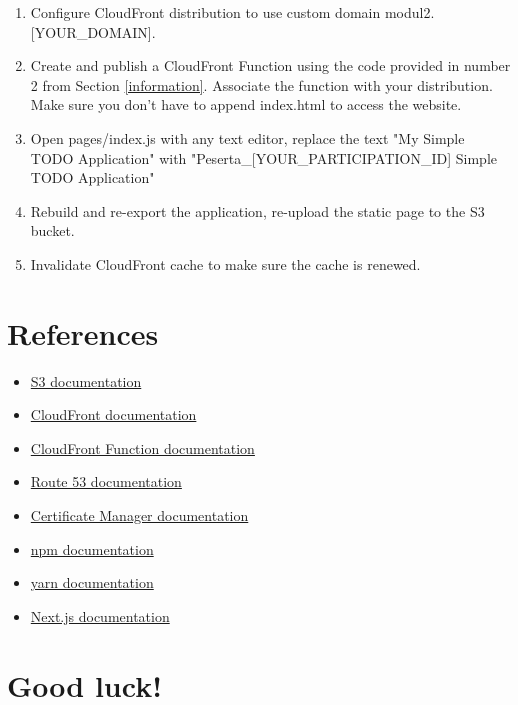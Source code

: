 \documentclass{article}
\begin{document}
\begin{enumerate}
    \item Configure CloudFront distribution to use custom domain modul2.[YOUR\_DOMAIN].
    \item Create and publish a CloudFront Function using the code provided in number 2 from Section \ref{information}. Associate the function with your distribution.\\
    Make sure you don't have to append index.html to access the website.
    \item Open pages/index.js with any text editor, replace the text "My Simple TODO Application" with "Peserta\_[YOUR\_PARTICIPATION\_ID] Simple TODO Application"
    \item Rebuild and re-export the application, re-upload the static page to the S3 bucket.
    \item Invalidate CloudFront cache to make sure the cache is renewed.
\end{enumerate}

\section{References}\label{references}

\begin{itemize}
    \item \href{https://docs.aws.amazon.com/AmazonS3/latest/userguide/Welcome.html}{S3 documentation}
    \item \href{https://docs.aws.amazon.com/AmazonCloudFront/latest/DeveloperGuide/Introduction.html}{CloudFront documentation}
    \item \href{https://docs.aws.amazon.com/AmazonCloudFront/latest/DeveloperGuide/cloudfront-functions.html}{CloudFront Function documentation}
    \item \href{https://docs.aws.amazon.com/Route53/latest/DeveloperGuide/Welcome.html}{Route 53 documentation}
    \item \href{https://docs.aws.amazon.com/acm/latest/userguide/acm-overview.html}{Certificate Manager documentation}
    \item \href{https://docs.npmjs.com/cli/v8/commands}{npm documentation}
    \item \href{https://classic.yarnpkg.com/en/docs}{yarn documentation}
    \item \href{https://nextjs.org/docs/deployment}{Next.js documentation}
\end{itemize}

\section*{Good luck!}
\end{document}
